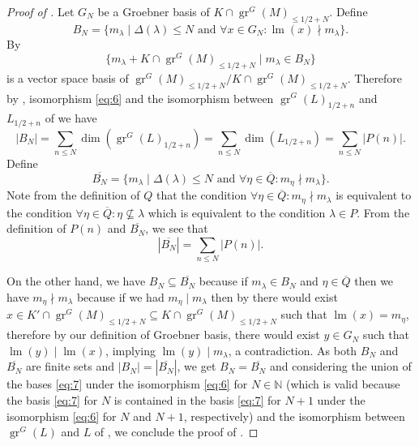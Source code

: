 \documentclass[12pt, a4paper]{article}
\DeclareMathOperator{\gr}{gr}
\DeclareMathOperator{\lm}{lm}
\begin{document}
\begin{proof}[Proof of ]
  Let $G_N$ be a Groebner basis of $K \cap \gr^G(M)_{\le 1/2 + N}$.
  Define
  \begin{equation*}
    B_N = \{m_\lambda \mid \Delta(\lambda) \le N\text{ and }\forall x \in G_N: \lm(x) \nmid m_\lambda\}.
  \end{equation*}
  By  
  \begin{equation}
    \label{eq:7}
    \{m_\lambda + K \cap \gr^G(M)_{\le 1/2 + N} \mid m_\lambda \in B_N\}
  \end{equation}
  is a vector space basis of $\gr^G(M)_{\le 1/2 + N}/K \cap \gr^G(M)_{\le 1/2 + N}$.
  Therefore by , isomorphism \eqref{eq:6} and the isomorphism between $\gr^G(L)_{1/2 + n}$ and $L_{1/2 + n}$ of  we have
  \begin{equation*}
    |B_N| = \sum_{n \le N}\dim(\gr^G(L)_{1/2 + n}) = \sum_{n \le N}\dim(L_{1/2 + n}) = \sum_{n \le N}|P(n)|.
  \end{equation*}
  Define
  \begin{equation*}
    \overline{B_N} = \{m_\lambda \mid \Delta(\lambda) \le N\text{ and }\forall \eta \in \overline{Q}: m_\eta \nmid m_\lambda\}.
  \end{equation*}
  Note from the definition of $Q$ that the condition $\forall \eta\in \overline{Q}: m_\eta \nmid m_\lambda$ is equivalent to the condition $\forall \eta \in \overline{Q}: \eta \nsubseteq \lambda$ which is equivalent to the condition $\lambda \in P$.
  From the definition of $P(n)$ and $\overline{B_N}$, we see that
  \begin{equation*}
    |\overline{B_N}| = \sum_{n \le N}|P(n)|.
  \end{equation*}
  
  On the other hand, we have $B_N \subseteq \overline{B_N}$ because if $m_\lambda \in B_N$ and $\eta \in \overline{Q}$ then we have $m_\eta \nmid m_\lambda$ because if we had $m_\eta \mid m_\lambda$ then by  there would exist $x \in K' \cap \gr^G(M)_{\le 1/2 + N} \subseteq K \cap \gr^G(M)_{\le 1/2 + N}$ such that $\lm(x) = m_\eta$, therefore by our definition of Groebner basis, there would exist $y \in G_N$ such that $\lm(y) \mid \lm(x)$, implying $\lm(y) \mid m_\lambda$, a contradiction.
  As both $B_N$ and $\overline{B_N}$ are finite sets and $|B_N| = |\overline{B_N}|$, we get $B_N = \overline{B_N}$ and considering the union of the bases \eqref{eq:7} under the isomorphism \eqref{eq:6} for $N \in \mathbb{N}$ (which is valid because the basis \eqref{eq:7} for $N$ is contained in the basis \eqref{eq:7} for $N + 1$ under the isomorphism \eqref{eq:6} for $N$ and $N + 1$, respectively) and the isomorphism between $\gr^G(L)$ and $L$ of , we conclude the proof of .
\end{proof}
\end{document}

